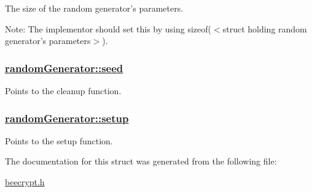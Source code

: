 The size of the random generator's parameters. 

\begin{Desc}
\item[Note:]The implementor should set this by using sizeof($<$struct holding random generator's parameters$>$). \end{Desc}
\hypertarget{structrandomGenerator_o3}{
\subsubsection[seed]{\setlength{\rightskip}{0pt plus 5cm}\hyperlink{structrandomGenerator_o3}{random\-Generator::seed}}}
\label{structrandomGenerator_o3}


Points to the cleanup function. 

\hypertarget{structrandomGenerator_o2}{
\subsubsection[setup]{\setlength{\rightskip}{0pt plus 5cm}\hyperlink{structrandomGenerator_o2}{random\-Generator::setup}}}
\label{structrandomGenerator_o2}


Points to the setup function. 



The documentation for this struct was generated from the following file:\begin{CompactItemize}
\item 
\hyperlink{beecrypt_8h}{beecrypt.h}\end{CompactItemize}
